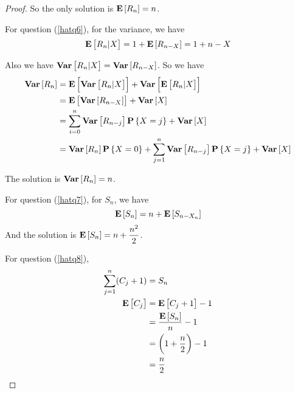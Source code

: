 \begin{proof}
    So the only solution is $\expect{R_n} = n$.
    
    For question (\ref{hatq6}), for the variance, we have
    \begin{equation*}
        \expect{R_n|X} = 1 + \expect{R_{n-X}} = 1 + n - X
    \end{equation*}
    
    Also we have $\variance{R_n|X} = \variance{R_{n-X}}$. So we have
    \begin{equation*}
        \begin{aligned}
            \variance{R_n} &= \expect{\variance{R_n|X}} + \variance{\expect{R_n|X}} \\
            &= \expect{\variance{R_{n-X}}} + \variance{X} \\
            &= \sum_{i=0}^n \variance{R_{n-j}} \probability{X=j} + \variance{X} \\
            &= \variance{R_n}\probability{X = 0} + \sum_{j=1}^n \variance{R_{n-j}} \probability{X=j} + \variance{X}
        \end{aligned}
    \end{equation*}
    
    The solution is $\variance{R_n} = n$.
    
    
    For question (\ref{hatq7}), for $S_n$, we have
    \begin{equation*}
        \expect{S_n} = n + \expect{S_{n - X_n}}
    \end{equation*}
    And the solution is $\expect{S_n} = n + \displaystyle \frac{n^2}{2}$.
    
    For question (\ref{hatq8}),
    \begin{equation*}
        \begin{aligned}
            \sum_{j=1}^n (C_j + 1) & = S_n \\
            \expect{C_j} &= \expect{C_j + 1} -1 \\
            &= \displaystyle \frac{\expect{S_n}}{n}  -1\\
            &= \left( 1 + \frac{n}{2} \right) - 1 \\
            &= \frac{n}{2}
        \end{aligned}
    \end{equation*}
\end{proof}

